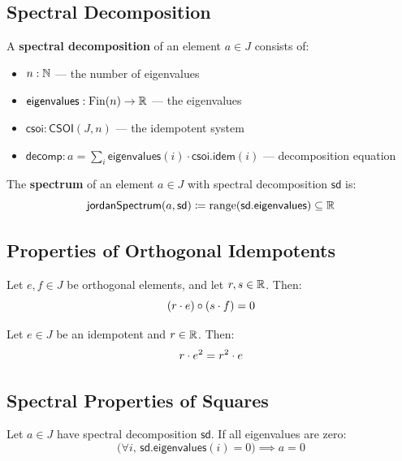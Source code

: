 \subsection{Spectral Decomposition}

\begin{definition}[SpectralDecomp]
A \textbf{spectral decomposition} of an element $a \in J$ consists of:
\begin{itemize}
  \item $n : \mathbb{N}$ --- the number of eigenvalues
  \item $\mathsf{eigenvalues} : \mathrm{Fin}(n) \to \mathbb{R}$ --- the eigenvalues
  \item $\mathsf{csoi} : \mathsf{CSOI}(J, n)$ --- the idempotent system
  \item $\mathsf{decomp} : a = \sum_{i} \mathsf{eigenvalues}(i) \cdot \mathsf{csoi}.\mathsf{idem}(i)$ --- decomposition equation
\end{itemize}
\end{definition}

\begin{definition}[jordanSpectrum]
The \textbf{spectrum} of an element $a \in J$ with spectral decomposition $\mathsf{sd}$ is:
\[ \mathsf{jordanSpectrum}(a, \mathsf{sd}) \coloneqq \mathrm{range}(\mathsf{sd}.\mathsf{eigenvalues}) \subseteq \mathbb{R} \]
\end{definition}

\subsection{Properties of Orthogonal Idempotents}

\begin{theorem}
Let $e, f \in J$ be orthogonal elements, and let $r, s \in \mathbb{R}$. Then:
\[ (r \cdot e) \circ (s \cdot f) = 0 \]
\end{theorem}

\begin{theorem}
Let $e \in J$ be an idempotent and $r \in \mathbb{R}$. Then:
\[ r \cdot e^{2} = r^2 \cdot e \]
\end{theorem}

\subsection{Spectral Properties of Squares}

\begin{theorem}
Let $a \in J$ have spectral decomposition $\mathsf{sd}$. If all eigenvalues are zero:
\[ \bigl(\forall i,\, \mathsf{sd}.\mathsf{eigenvalues}(i) = 0\bigr) \implies a = 0 \]
\end{theorem}

